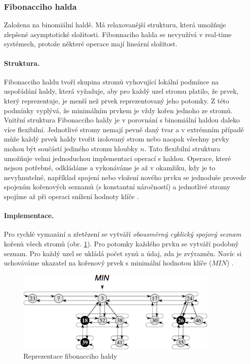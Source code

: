 \subsubsection*{Fibonacciho halda}
Založena na binomiální haldě. Má relaxovanější strukturu, která umožňuje zlepšené asymptotické složitosti. Fibonnaciho halda se nevyužívá v real-time systémech, protože některé operace mají lineární složitost.

\paragraph{Struktura.} Fibonacciho haldu tvoří skupina stromů vyhovující lokální podmínce na uspořádání haldy, která vyžaduje, aby pro každý uzel stromu platilo, že prvek, který reprezentuje, je menší než prvek reprezentovaný jeho potomky. Z této podmínky vyplývá, že minimálním prvkem je vždy kořen jednoho ze stromů. Vnitřní struktura Fibonacciho haldy je v porovnání s binomiální haldou daleko více flexibilní. Jednotlivé stromy nemají pevně daný tvar a v extrémním případě může každý prvek haldy tvořit izolovaný strom nebo naopak všechny prvky mohou být součástí jediného stromu hloubky $n$. Tato flexibilní struktura umožňuje velmi jednoduchou implementaci operací s haldou. Operace, které nejsou potřebné, odkládáme a vykonáváme je až v okamžiku, kdy je to nevyhnutelné, například spojení nebo vložení nového prvku se jednoduše provede spojením kořenových seznamů (s konstantní náročností) a jednotlivé stromy spojíme až při operaci snížení hodnoty klíče \cite{wiki:fibonacci}.

\paragraph{Implementace.} Pro rychlé vymazání a zřetězení se vytváří \textit{obousměrný cyklický spojový seznam} kořenů všech stromů (obr. \ref{fig:fibonacci_heap}). Pro potomky každého prvku se vytváří podobný seznam. Pro každý uzel se ukládá počet synů a údaj, zda je zvýrazněn. Navíc si uchováváme ukazatel na kořenový prvek s minimální hodnotou klíče ($MIN$) \cite{wiki:fibonacci}.

\begin{figure}[htbp]
    \begin{center}
        \includegraphics[width=100mm]{01/images/fibonacci_heap}
        \caption{Reprezentace fibonacciho haldy}
        \label{fig:fibonacci_heap}
    \end{center}
\end{figure}

